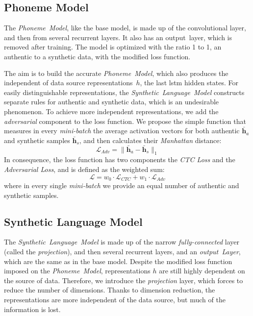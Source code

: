 \subsection*{Phoneme Model}

The \textit{Phoneme~Model}, like the base model, is made up of the convolutional layer,
and then from several recurrent layers.
It also has an output~layer, which is removed after training.
The model is optimized with the ratio 1 to 1, an authentic to a synthetic data,
with the modified loss function.

The aim is to build the accurate \textit{Phoneme~Model}, which also produces
the independent of data source representations~$h$, the last \acrshort{lstm} hidden states.
For easily distinguishable representations, the \textit{Synthetic~Language~Model} constructs
separate rules for authentic and synthetic data, which is an undesirable phenomenon.
To achieve more independent representations, we add the \textit{adversarial} component to the loss function.
We propose the simple function that measures in every \textit{mini-batch} the average activation vectors
for both authentic $\mathbf{\bar{h}}_{a}$ and synthetic samples $\mathbf{\bar{h}}_{s}$, and then
calculates their \textit{Manhattan} distance:
\begin{equation}
\mathcal{L}_{Adv} = \|\mathbf{\bar{h}}_{a} - \mathbf{\bar{h}}_{s} \|_{1}
\end{equation}
In consequence, the loss function has two components the \textit{CTC Loss} and the \textit{Adversarial Loss},
and is defined as the weighted sum:
\begin{equation}
\mathcal{L} = w_0 \cdot \mathcal{L}_{CTC} + w_1 \cdot \mathcal{L}_{Adv}
\end{equation}
where in every single \textit{mini-batch} we provide an equal number of authentic and synthetic samples.


\subsection*{Synthetic Language Model}

The \textit{Synthetic~Language~Model} is made up of the narrow \textit{fully-connected} layer
(called the \textit{projection}), and then several recurrent layers, and an \textit{output~Layer},
which are the same as in the base model.
Despite the modified loss function imposed on the \textit{Phoneme~Model}, representations $h$ are
still highly dependent on the source of data.
Therefore, we introduce the \textit{projection} layer, which forces to reduce the number of dimensions.
Thanks to dimension reduction, the representations are more independent of the data source,
but much of the information is lost.

